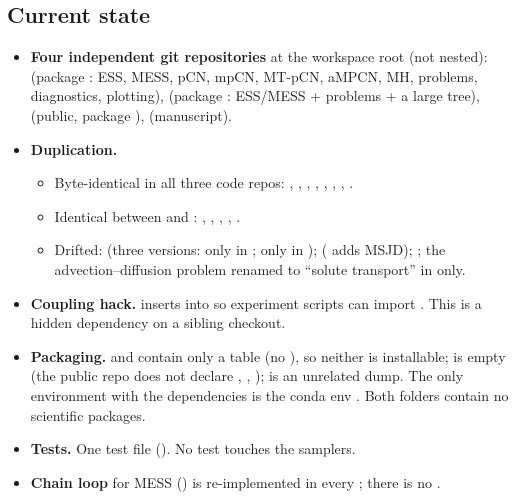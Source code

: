 \documentclass[11pt,a4paper]{article}
\theoremstyle{remark}
\begin{document}
\subsection{Current state}
\begin{itemize}[leftmargin=*]
\item \textbf{Four independent git repositories} at the workspace root (not nested):  (package : ESS, MESS, pCN, mpCN, MT-pCN, aMPCN, MH, problems, diagnostics, plotting),  (package : ESS/MESS + problems + a large  tree),  (public, package ),  (manuscript).
\item \textbf{Duplication.}
  \begin{itemize}
  \item Byte-identical in all three code repos: , , , , , , , .
  \item Identical between  and : , , , , .
  \item Drifted:  (three versions:  only in ;  only in );  ( adds MSJD); ; the advection--diffusion problem renamed to ``solute transport'' in  only.
  \end{itemize}
\item \textbf{Coupling hack.}  inserts  into  so experiment scripts can import . This is a hidden dependency on a sibling checkout.
\item \textbf{Packaging.}  and  contain only a  table (no \code{[project]}), so neither is installable;  is empty (the public repo does not declare , , );  is an unrelated  dump. The only environment with the dependencies is the conda env . Both  folders contain no scientific packages.
\item \textbf{Tests.} One test file (). No test touches the samplers.
\item \textbf{Chain loop} for MESS () is re-implemented in every ; there is no .
\end{itemize}
\end{document}
